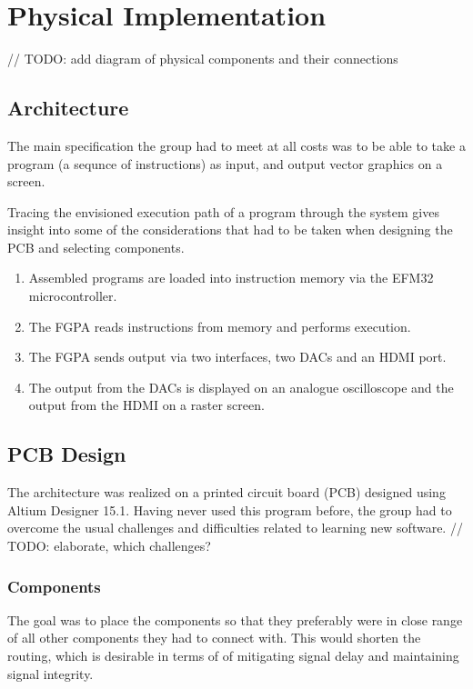 \chapter{Physical Implementation}

// TODO: add diagram of physical components and their connections

\section{Architecture}
The main specification the group had to meet at all costs was to be able to take a program (a sequnce of instructions) as input, and output vector graphics on a screen.

Tracing the envisioned execution path of a program through the system gives insight into some of the considerations that had to be taken when designing the PCB and selecting components.

\begin{enumerate}
\item Assembled \vthreek programs are loaded into instruction memory via the EFM32 microcontroller.
\item The FGPA reads instructions from memory and performs execution.
\item The FGPA sends output via two interfaces, two DACs and an HDMI port.
\item The output from the DACs is displayed on an analogue oscilloscope and the output from the HDMI on a raster screen.
\end{enumerate}

\section{PCB Design}
The architecture was realized on a printed circuit board (PCB) designed using Altium Designer 15.1.
Having never used this program before, the group had to overcome the usual challenges and difficulties related to learning new software. // TODO: elaborate, which challenges?

\subsection{Components}
The goal was to place the components so that they preferably were in close range of all other components they had to connect with. 
This would shorten the routing, which is desirable in terms of of mitigating signal delay and maintaining signal integrity.

